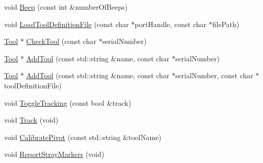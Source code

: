 \begin{DoxyCompactItemize}
\item 
void \hyperlink{classmts_n_d_i_serial_a25982a00da395910da9515daf846c83e}{Beep} (const int \&number\+Of\+Beeps)
\item 
void \hyperlink{classmts_n_d_i_serial_a9e8848fd10c1eedf29ce83553c79f3fb}{Load\+Tool\+Definition\+File} (const char $\ast$port\+Handle, const char $\ast$file\+Path)
\item 
\hyperlink{classmts_n_d_i_serial_1_1_tool}{Tool} $\ast$ \hyperlink{classmts_n_d_i_serial_a3b62c56eb465069a75c2597cdf0da592}{Check\+Tool} (const char $\ast$serial\+Number)
\item 
\hyperlink{classmts_n_d_i_serial_1_1_tool}{Tool} $\ast$ \hyperlink{classmts_n_d_i_serial_a8229beb26f46444a747af55b003b50ff}{Add\+Tool} (const std\+::string \&name, const char $\ast$serial\+Number)
\item 
\hyperlink{classmts_n_d_i_serial_1_1_tool}{Tool} $\ast$ \hyperlink{classmts_n_d_i_serial_abfc2742f954c63b8b88464ced4c8c72e}{Add\+Tool} (const std\+::string \&name, const char $\ast$serial\+Number, const char $\ast$tool\+Definition\+File)
\item 
void \hyperlink{classmts_n_d_i_serial_ad75c633cc225f9c2b9a22ba7916d734f}{Toggle\+Tracking} (const bool \&track)
\item 
void \hyperlink{classmts_n_d_i_serial_a77daeb77f8acf7a18d062eaa7c400d76}{Track} (void)
\item 
void \hyperlink{classmts_n_d_i_serial_a8e8407248f820a59572c4057783d492b}{Calibrate\+Pivot} (const std\+::string \&tool\+Name)
\item 
void \hyperlink{classmts_n_d_i_serial_ad6ad01c2825a54df61bd248d53a14266}{Report\+Stray\+Markers} (void)
\end{DoxyCompactItemize}
